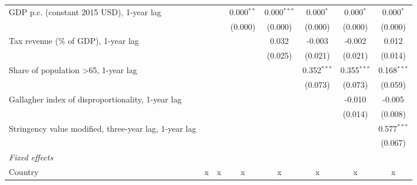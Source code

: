 \begin{table}[htbp]
\begin{tabular}{lccccccc}
      GDP p.c. (constant 2015 USD), 1-year lag                                                  &         &         & 0.000$^{**}$ & 0.000$^{***}$ & 0.000$^{*}$   & 0.000$^{*}$   & 0.000$^{*}$\\   
                                                                                                &         &         & (0.000)      & (0.000)       & (0.000)       & (0.000)       & (0.000)\\   
      Tax revenue (\% of GDP), 1-year lag                                                       &         &         &              & 0.032         & -0.003        & -0.002        & 0.012\\   
                                                                                                &         &         &              & (0.025)       & (0.021)       & (0.021)       & (0.014)\\   
      Share of population >65, 1-year lag                                                       &         &         &              &               & 0.352$^{***}$ & 0.355$^{***}$ & 0.168$^{***}$\\   
                                                                                                &         &         &              &               & (0.073)       & (0.073)       & (0.059)\\   
      Gallagher index of disproportionality, 1-year lag                                         &         &         &              &               &               & -0.010        & -0.005\\   
                                                                                                &         &         &              &               &               & (0.014)       & (0.008)\\   
      Stringency value modified, three-year lag, 1-year lag                                     &         &         &              &               &               &               & 0.577$^{***}$\\   
                                                                                                &         &         &              &               &               &               & (0.067)\\   
      \emph{Fixed effects}\\
      Country                                                                                   & x       & x       & x            & x             & x             & x             & x\\  

\end{tabular}
\end{table}
